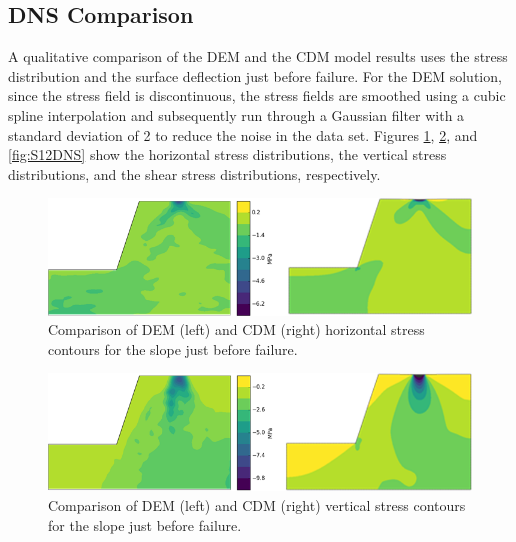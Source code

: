 \subsection{DNS Comparison}

A qualitative comparison of the DEM and the CDM model results uses the stress distribution and the surface deflection just before failure. For the DEM solution, since the stress field is discontinuous, the stress fields are smoothed using a cubic spline interpolation and subsequently run through a Gaussian filter with a standard deviation of 2 to reduce the noise in the data set. Figures \ref{fig:S11DNS}, \ref{fig:S22DNS}, and \ref{fig:S12DNS} show the horizontal stress distributions, the vertical stress distributions, and the shear stress distributions, respectively.

\begin{figure}[!htb]
\begin{center}
\includegraphics[width=\textwidth]{figures/S11Contours/S11}
\caption{{\label{fig:S11DNS} Comparison of DEM (left) and CDM (right) horizontal stress contours for the slope just before failure.%
}}
\end{center}
\end{figure}

\begin{figure}[!htb]
\begin{center}
\includegraphics[width=\textwidth]{figures/S22Contours/S22}
\caption{{\label{fig:S22DNS} Comparison of DEM (left) and CDM (right) vertical stress contours for the slope just before failure.%
}}
\end{center}
\end{figure}

